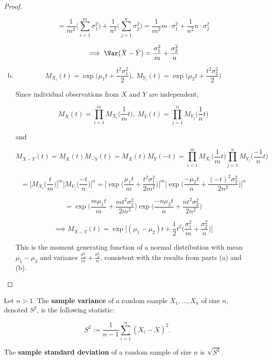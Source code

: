 \begin{proof}
\begin{enumerate}[a.]
\[
= \frac{1}{m^2 }\bigg(\sum_{i=1}^m \sigma_1^2 \bigg) + \frac{1}{n^2} \bigg(  \sum_{j=1}^n \sigma_2^2 \bigg) = \frac{1}{m^2}m \cdot \sigma_1^2 + \frac{1}{n^2} n \cdot \sigma_2^2
\]

\[
\implies
\Var (\bar{X} - \bar{Y}) = \frac{\sigma_1^2}{m} + \frac{\sigma_2^2}{n} 
\]

\item

\[
M_{X_i}(t) = \exp\bigg(\mu_1 t + \frac{t^2 \sigma_1^2}{2} \bigg), \ M_{Y_i}(t) = \exp\bigg(\mu_2 t + \frac{t^2 \sigma_2^2}{2} \bigg)
\]

Since individual observations from \(X\) and \(Y\) are independent,

\[
M_{\bar{X}}(t) = \prod_{i=1}^m M_{X_i}\bigg(\frac{1}{m}t\bigg), \ M_{\bar{Y}}(t) = \prod_{j=1}^n M_{Y_j}\bigg(\frac{1}{n}t\bigg)
\]

and

\[
M_{\bar{X} - \bar{Y}}(t) = M_{\bar{X}}(t) M_{\bar{-Y}}(t) = M_{\bar{X}}(t) M_{\bar{Y}}(-t) = \prod_{i=1}^m M_{X_i}\bigg(\frac{1}{m}t\bigg) \prod_{j=1}^n M_{Y_j}\bigg(\frac{-1}{n}t\bigg)
\]

\[
= \bigg[ M_{X_i}\bigg(\frac{t}{m} \bigg) \bigg] ^m  \bigg[ M_{Y_j}\bigg( \frac{-t}{n} \bigg)  \bigg]^n = \bigg[ \exp\bigg(\frac{\mu_1 t}{m} + \frac{t^2 \sigma_1^2}{2m^2} \bigg) \bigg] ^m  \bigg[ \exp\bigg(\frac{-\mu_2 t}{n} + \frac{(-t)^2 \sigma_2^2}{2n^2} \bigg) \bigg]^n
\]

\[
= \exp\bigg(\frac{m \mu_1 t}{m} + \frac{m t^2 \sigma_1^2}{2m^2} \bigg)   \exp\bigg(\frac{-n \mu_2 t}{n} + \frac{n t^2 \sigma_2^2}{2n^2} \bigg)
\]

\[
\implies \boxed{
M_{\bar{X} - \bar{Y}}(t) = \exp \bigg[ (\mu_1 - \mu_2)t + \frac{1}{2}t^2 \bigg( \frac{\sigma_1^2}{m}  + \frac{\sigma_2^2}{n} \bigg) \bigg]}
\]

This is the moment generating function of a normal distribution with mean \( \mu_1 - \mu_2\) and variance \(\frac{\sigma_1^2}{m}  + \frac{\sigma_2^2}{n}\), consistent with the results from parts (a) and (b).


\end{enumerate}

\end{proof}

\begin{definition} Let \(n > 1\). The \textbf{sample variance} of a random sample \(X_1, \ldots, X_n\) of size \(n\), denoted \(S^2\), is the following statistic:

\[
S^2 := \frac{1}{n-1} \sum_{i=1}^n (X_i - \overline{X})^2.
\]

The \textbf{sample standard deviation} of a random sample of size \(n\) is \(\sqrt{S^2}\).

\end{definition}

